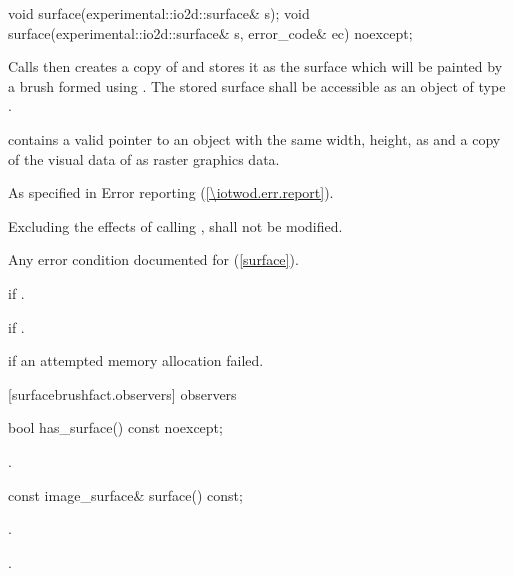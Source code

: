 \begin{itemdecl}
    void surface(experimental::io2d::surface& s);
    void surface(experimental::io2d::surface& s, error_code& ec) noexcept;
\end{itemdecl}
\begin{itemdescr}
	\pnum
	\effects
	Calls  then creates a copy of  and stores it as the surface which will be painted by a brush formed using . The stored surface shall be accessible as an object of type .
	
	\pnum
	\postconditions
	 contains a valid pointer to an  object with the same width, height,  as  and a copy of the visual data of  as raster graphics data.

	\pnum
	\throws
	As specified in Error reporting (\ref{\iotwod.err.report}).

	\pnum
	\remarks
	Excluding the effects of calling ,  shall not be modified.
	
	\pnum
	\errors
	Any error condition documented for  (\ref{surface}).
	
	\pnum
	 if .
	
	\pnum
	 if .

	\pnum
	 if an attempted memory allocation failed.

\end{itemdescr}

 [surfacebrushfact.observers]{ observers}

\begin{itemdecl}
    bool has_surface() const noexcept;
\end{itemdecl}
\begin{itemdescr}
	\pnum
	\returns
	.

\end{itemdescr}

\begin{itemdecl}
    const image_surface& surface() const;
\end{itemdecl}
\begin{itemdescr}
	\pnum
	\preconditions
	.
	
	\pnum
	\returns
	.
	
\end{itemdescr}
